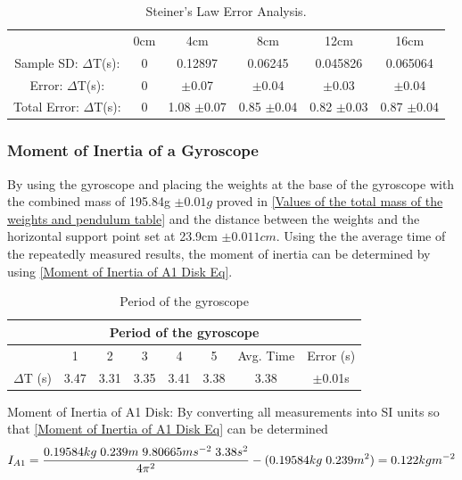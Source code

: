 \documentclass[12pt]{article}
\begin{document}
\begin{table}[H]
\begin{center}
 \footnotesize
 \begin{tabular}{c c c c c c}
 & 0cm &4cm & 8cm & 12cm & 16cm \\
 Sample SD: $\Delta$T(s): & 0 & 0.12897 & 0.06245 & 0.045826 & 0.065064\\
 Error: $\Delta$T(s): & 0 & $\pm$0.07 & $\pm$0.04 & $\pm$0.03 & $\pm$0.04 \\
 Total Error: $\Delta$T(s): & 0 & 1.08 $\pm$0.07 & 0.85 $\pm$0.04 & 0.82 $\pm$0.03 & 0.87 $\pm$0.04 \\
 \end{tabular}
 \caption{Steiner's Law Error Analysis.}
 \label{1.2 Error Analysis SD}
\end{center}
\end{table}

\subsubsection{Moment of Inertia of a Gyroscope}
\label{Moment of Inertia of a Gyroscope Findings}

By using the gyroscope and placing the weights at the base of the gyroscope with the combined mass of 195.84g $\pm0.01g$ proved in \cref{Values of the total mass of the weights and pendulum table} and the distance between the weights and the horizontal support point set at 23.9cm $\pm0.011cm$. Using the the average time of the repeatedly measured results, the moment of inertia can be determined by using \cref{Moment of Inertia of A1 Disk Eq}.

\begin{table}[H]
\begin{center}
 \footnotesize
 \begin{tabular}{|c||c|c|c|c|c|c|c|}
 \hline
 \multicolumn{8}{|c|}{Period of the gyroscope} \\
 \hline \hline
  & 1 & 2 & 3 & 4 & 5 & Avg. Time & Error (s) \\
 \hline
 $\Delta$T (s) & 3.47 & 3.31 & 3.35 & 3.41 & 3.38 & 3.38 & $\pm$0.01s \\
 \hline
 \end{tabular}
 \caption{Period of the gyroscope}
 \label{Period of the gyroscope table}
\end{center}
\end{table}

Moment of Inertia of A1 Disk:
By converting all measurements into SI units so that \cref{Moment of Inertia of A1 Disk Eq} can be determined
\begin{equation}
 \centering
 I_{A1} = \dfrac{0.19584kg\hspace{0.1cm} 0.239m\hspace{0.1cm} 9.80665ms^{-2}\hspace{0.1cm} 3.38s^2}{4{\pi}^2} - (0.19584kg\hspace{0.1cm} 0.239m^2) = 0.122kgm^{-2}
 \label{Moment of Inertia of gyroscope Ans}
\end{equation} \\
\end{document}
